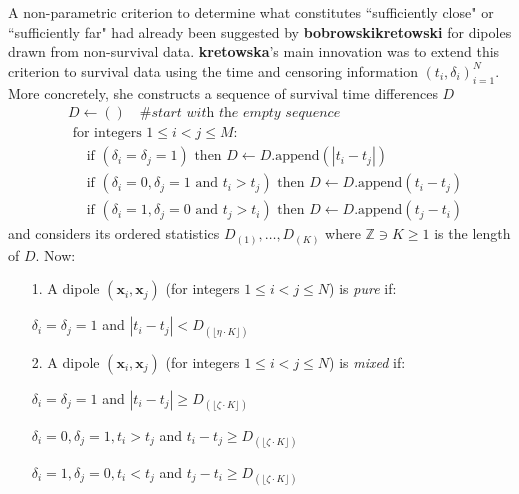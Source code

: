 \documentclass[12pt]{amsart}
\theoremstyle{definition}
\theoremstyle{plain}
\theoremstyle{remark}
\newcommand{\ZZ}{\mathbb{Z}}
\begin{document}
A non-parametric criterion to determine what constitutes ``sufficiently close" or ``sufficiently far" had already been suggested by \textbf{bobrowskikretowski} for dipoles drawn from non-survival data. \textbf{kretowska}'s main innovation was to extend this criterion to survival data using the time and censoring information $(t_i, \delta_i)_{i = 1}^N$. More concretely, she constructs a sequence of survival time differences $D$
\begin{align*}
&D \leftarrow () \quad \textit{\# start with the empty sequence} \\
&\text{ for integers } 1 \leq i < j \leq M: \\
&\quad \text{ if } (\delta_i = \delta_j = 1) \text{ then } D \leftarrow D.\text{append}(|t_i - t_j|) \\
&\quad \text{ if } (\delta_i = 0, \delta_j = 1 \text{ and } t_i > t_j) \text{ then } D \leftarrow D.\text{append}(t_i - t_j) \\
&\quad \text{ if } (\delta_i = 1, \delta_j = 0 \text{ and } t_j > t_i) \text{ then } D \leftarrow D.\text{append}(t_j - t_i)
\end{align*} and considers its ordered statistics $D_{(1)}, \ldots, D_{(K)}$ where $\ZZ \ni K \geq 1$ is the length of $D$. Now:
\begin{itemize}
	\item[1.] A dipole $(\mathbf{x}_i, \mathbf{x}_j)$ (for integers $1 \leq i < j \leq N$) is \emph{pure} if:
	
	$\delta_i = \delta_j = 1$ and $|t_i - t_j| < D_{(\lfloor \eta \cdot K \rfloor)}$
	
	\item[2.] A dipole $(\mathbf{x}_i, \mathbf{x}_j)$ (for integers $1 \leq i < j \leq N$) is \emph{mixed} if:
	
	$\delta_i = \delta_j = 1$ and $|t_i - t_j| \geq D_{(\lfloor \zeta \cdot K \rfloor)}$
	
	$\delta_i = 0, \delta_j = 1, t_i > t_j$ and $t_i - t_j \geq D_{(\lfloor \zeta \cdot K \rfloor)}$
	
	$\delta_i = 1, \delta_j = 0, t_i < t_j$ and $t_j - t_i \geq D_{(\lfloor \zeta \cdot K \rfloor)}$
\end{itemize}






\end{document}

